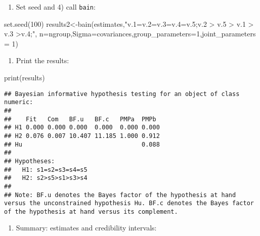 \documentclass[
]{book}
\newenvironment{Shaded}{\begin{snugshade}}{\end{snugshade}}
\newcommand{\AttributeTok}[1]{\textcolor[rgb]{0.77,0.63,0.00}{#1}}
\newcommand{\DecValTok}[1]{\textcolor[rgb]{0.00,0.00,0.81}{#1}}
\newcommand{\FunctionTok}[1]{\textcolor[rgb]{0.00,0.00,0.00}{#1}}
\newcommand{\NormalTok}[1]{#1}
\newcommand{\OtherTok}[1]{\textcolor[rgb]{0.56,0.35,0.01}{#1}}
\newcommand{\StringTok}[1]{\textcolor[rgb]{0.31,0.60,0.02}{#1}}
\providecommand{\tightlist}{%
  \setlength{\itemsep}{0pt}\setlength{\parskip}{0pt}}
\begin{document}
\begin{enumerate}
\def\labelenumi{\arabic{enumi})}
\setcounter{enumi}{2}
\tightlist
\item
  Set seed and 4) call \texttt{bain}:
\end{enumerate}

\begin{Shaded}
\begin{Highlighting}[]
\FunctionTok{set.seed}\NormalTok{(}\DecValTok{100}\NormalTok{)}
\NormalTok{results2}\OtherTok{\textless{}{-}}\FunctionTok{bain}\NormalTok{(estimates,}\StringTok{"v.1=v.2=v.3=v.4=v.5;v.2 \textgreater{} v.5 \textgreater{} v.1 \textgreater{} v.3 \textgreater{}v.4;"}\NormalTok{,}
\AttributeTok{n=}\NormalTok{ngroup,}\AttributeTok{Sigma=}\NormalTok{covariances,}\AttributeTok{group\_parameters=}\DecValTok{1}\NormalTok{,}\AttributeTok{joint\_parameters =} \DecValTok{1}\NormalTok{)}
\end{Highlighting}
\end{Shaded}

\begin{enumerate}
\def\labelenumi{\arabic{enumi})}
\setcounter{enumi}{4}
\tightlist
\item
  Print the results:
\end{enumerate}

\begin{Shaded}
\begin{Highlighting}[]
\FunctionTok{print}\NormalTok{(results)}
\end{Highlighting}
\end{Shaded}

\begin{verbatim}
## Bayesian informative hypothesis testing for an object of class numeric:
## 
##    Fit   Com   BF.u   BF.c   PMPa  PMPb 
## H1 0.000 0.000 0.000  0.000  0.000 0.000
## H2 0.076 0.007 10.407 11.185 1.000 0.912
## Hu                                 0.088
## 
## Hypotheses:
##   H1: s1=s2=s3=s4=s5
##   H2: s2>s5>s1>s3>s4
## 
## Note: BF.u denotes the Bayes factor of the hypothesis at hand versus the unconstrained hypothesis Hu. BF.c denotes the Bayes factor of the hypothesis at hand versus its complement.
\end{verbatim}

\begin{enumerate}
\def\labelenumi{\arabic{enumi})}
\setcounter{enumi}{5}
\tightlist
\item
  Summary: estimates and credibility intervals:
\end{enumerate}
\end{document}
